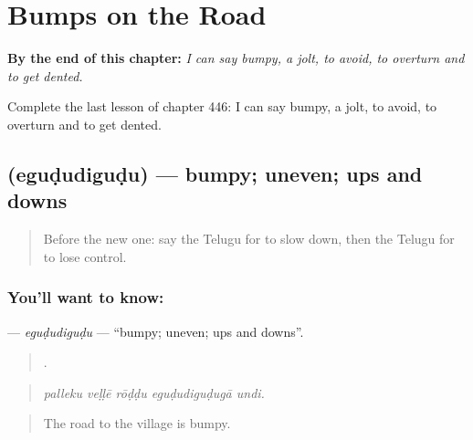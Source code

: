 
\chapter{Bumps on the Road}
\label{ch:te-bumps-on-the-road}

\begin{chapteropening}
\textbf{By the end of this chapter:} \emph{I can say bumpy, a jolt, to avoid, to overturn and to get dented.}

Complete the last lesson of chapter 446: I can say bumpy, a jolt, to avoid, to overturn and to get dented.
\end{chapteropening}

\section[\texorpdfstring{\te{ఎగుడుదిగుడు} (eguḍudiguḍu)}{ఎగుడుదిగుడు (eguḍudiguḍu)}]{ (eguḍudiguḍu) — bumpy; uneven; ups and downs}

\label{lesson:TE-C446-egududigudu}



\begin{quote}
Before the new one: say the Telugu for to slow down, then the Telugu for to lose control.
\end{quote}

\subsection*{You'll want to know: }
\textbf{} — \emph{eguḍudiguḍu} — \textquotedblleft{}bumpy; uneven; ups and downs\textquotedblright{}.

\begin{quote}
    .
\end{quote}

\begin{quote}
\emph{palleku veḷḷē rōḍḍu eguḍudiguḍugā undi.}
\end{quote}

\begin{quote}
The road to the village is bumpy.
\end{quote}

